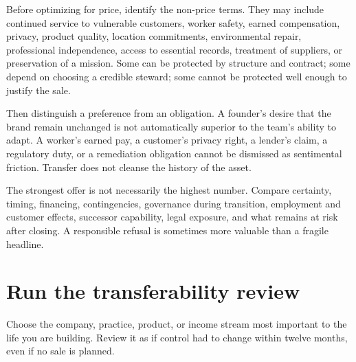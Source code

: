 Before optimizing for price, identify the non-price terms. They may include
continued service to vulnerable customers, worker safety, earned compensation,
privacy, product quality, location commitments, environmental repair,
professional independence, access to essential records, treatment of suppliers,
or preservation of a mission. Some can be protected by structure and contract;
some depend on choosing a credible steward; some cannot be protected well enough
to justify the sale.

Then distinguish a preference from an obligation. A founder's desire that the
brand remain unchanged is not automatically superior to the team's ability to
adapt. A worker's earned pay, a customer's privacy right, a lender's claim, a
regulatory duty, or a remediation obligation cannot be dismissed as sentimental
friction. Transfer does not cleanse the history of the asset.

The strongest offer is not necessarily the highest number. Compare certainty,
timing, financing, contingencies, governance during transition, employment and
customer effects, successor capability, legal exposure, and what remains at
risk after closing. A responsible refusal is sometimes more valuable than a
fragile headline.

\section{Run the transferability review}

Choose the company, practice, product, or income stream most important to the
life you are building. Review it as if control had to change within twelve
months, even if no sale is planned.

